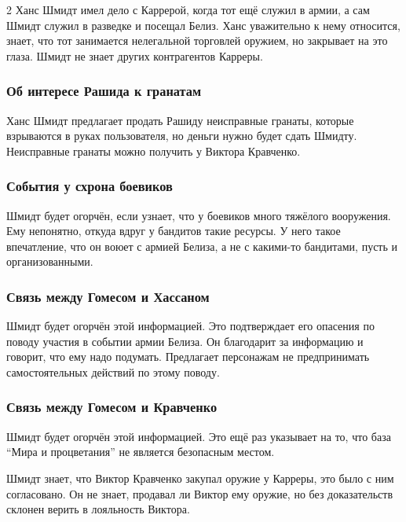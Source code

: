 \documentclass[twoside]{article}
\begin{document}
\begin{multicols}{2}
Ханс Шмидт имел дело с Каррерой, когда тот ещё служил в армии, а сам
Шмидт служил в разведке и посещал Белиз. Ханс уважительно к нему
относится, знает, что тот занимается нелегальной торговлей оружием, но
закрывает на это глаза. Шмидт не знает других контрагентов Карреры.

\subsubsection{Об интересе Рашида к гранатам}\label{rashid-grenades}

Ханс Шмидт предлагает продать Рашиду неисправные гранаты, которые
взрываются в руках пользователя, но деньги нужно будет сдать Шмидту.
Неисправные гранаты можно получить у Виктора Кравченко.

\subsubsection{События у схрона боевиков}\label{hideout-events}

Шмидт будет огорчён, если узнает, что у боевиков много тяжёлого
вооружения. Ему непонятно, откуда вдруг у бандитов такие ресурсы. У него
такое впечатление, что он воюет с армией Белиза, а не с какими-то
бандитами, пусть и организованными.

\subsubsection{Связь между Гомесом и Хассаном}\label{gomez-hassan-link}

Шмидт будет огорчён этой информацией. Это подтверждает его опасения по
поводу участия в событии армии Белиза. Он благодарит за информацию и
говорит, что ему надо подумать. Предлагает персонажам не предпринимать
самостоятельных действий по этому поводу.

\subsubsection{Связь между Гомесом и Кравченко}\label{gomez-kravchenko-link}

Шмидт будет огорчён этой информацией. Это ещё раз указывает на то, что
база \enquote{Мира и процветания} не является безопасным местом.

Шмидт знает, что Виктор Кравченко закупал оружие у Карреры, это было с
ним согласовано. Он не знает, продавал ли Виктор ему оружие, но без
доказательств склонен верить в лояльность Виктора.


\end{multicols}
\end{document}
